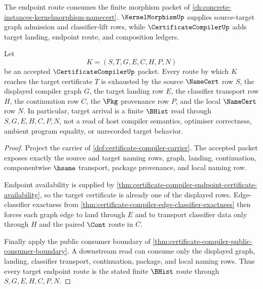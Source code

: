 \noindent The endpoint route consumes the finite morphism packet of
\autoref{ch:concrete-instances-kernelmorphism-namecert}.
$\KernelMorphismUp$ supplies source-target graph admission and
classifier-lift rows, while $\CertificateCompilerUp$ adds target landing,
endpoint route, and composition ledgers.

\begin{theorem}
\label{thm:certificate-compiler-target-endpoint-route}
Let
$$
K=(S,T,G,E,C,H,P,N)
$$
be an accepted $\CertificateCompilerUp$ packet. Every route by which $K$
reaches the target certificate $T$ is exhausted by the source $\NameCert$ row
$S$, the displayed compiler graph $G$, the target landing row $E$, the
classifier transport row $H$, the continuation row $C$, the $\Pkg$
provenance row $P$, and the local $\NameCert$ row $N$. In particular, target
arrival is a finite $\BHist$ read through $S,G,E,H,C,P,N$, not a read of host
compiler semantics, optimiser correctness, ambient program equality, or
unrecorded target behavior.
\end{theorem}
\begin{proof}
Project the carrier of \autoref{def:certificate-compiler-carrier}. The
accepted packet exposes exactly the source and target naming rows, graph,
landing, continuation, componentwise $\hsame$ transport, package provenance,
and local naming row.

Endpoint availability is supplied by
\autoref{thm:certificate-compiler-endpoint-certificate-availability}, so the
target certificate is already one of the displayed rows. Edge-classifier
exactness from \autoref{thm:certificate-compiler-edge-classifier-exactness}
then forces each graph edge to land through $E$ and to transport classifier
data only through $H$ and the paired $\Cont$ route in $C$.

Finally apply the public consumer boundary of
\autoref{thm:certificate-compiler-public-consumer-boundary}. A downstream
read can consume only the displayed graph, landing, classifier transport,
continuation, package, and local naming rows. Thus every target endpoint route
is the stated finite $\BHist$ route through $S,G,E,H,C,P,N$.
\end{proof}

